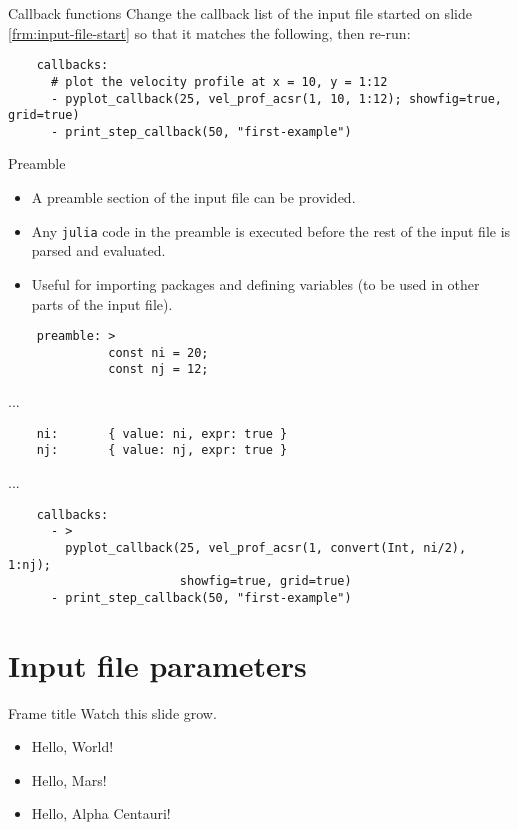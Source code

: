 \documentclass[pdf]{beamer}
\begin{document}
\begin{frame}[fragile]{Callback functions}
  Change the callback list of the input file started on slide \ref{frm:input-file-start} so that it matches the following, then re-run:
  \tiny
  \begin{verbatim}
    callbacks:
      # plot the velocity profile at x = 10, y = 1:12
      - pyplot_callback(25, vel_prof_acsr(1, 10, 1:12); showfig=true, grid=true)
      - print_step_callback(50, "first-example")
  \end{verbatim}
\end{frame}

\begin{frame}[fragile]{Preamble}
  \begin{itemize}
    \item A preamble section of the input file can be provided.
    \item Any \texttt{julia} code in the preamble is executed before the rest of the input file is parsed and evaluated.
    \item Useful for importing packages and defining variables (to be used in other parts of the input file).
  \end{itemize}
  \tiny
  \begin{verbatim}
    preamble: >
              const ni = 20;
              const nj = 12;
  \end{verbatim}
  ...
  \begin{verbatim}
    ni:       { value: ni, expr: true }
    nj:       { value: nj, expr: true }
  \end{verbatim}
  ...
  \begin{verbatim}
    callbacks:
      - >
        pyplot_callback(25, vel_prof_acsr(1, convert(Int, ni/2), 1:nj); 
                        showfig=true, grid=true)
      - print_step_callback(50, "first-example")
  \end{verbatim}
\end{frame}

\section{Input file parameters}

\begin{frame}{Frame title}
  Watch this slide grow.
  \pause
  \begin{itemize}
    \item Hello, World!
      \pause
    \item Hello, Mars!
      \pause
    \item Hello, Alpha Centauri!
  \end{itemize}
\end{frame}
\end{document}

